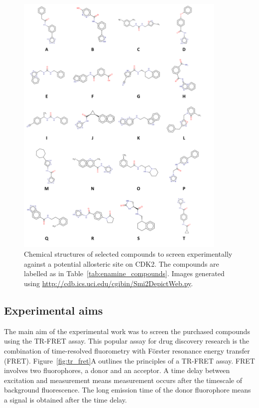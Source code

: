 \begin{figure}
\centering

\includegraphics[width=0.9\textwidth]{figures/compound_structures/compound_structures}

\caption{Chemical structures of selected compounds to screen experimentally against a potential allosteric site on CDK2.
The compounds are labelled as in Table~\ref{tab:enamine_compounds}.
Images generated using \url{http://cdb.ics.uci.edu/cgibin/Smi2DepictWeb.py}.}

\label{fig:compound_structures}
\end{figure}


\subsection{Experimental aims}

The main aim of the experimental work was to screen the purchased compounds using the TR-FRET assay.
This popular assay for drug discovery research is the combination of time-resolved fluorometry with F\"{o}rster resonance energy transfer (FRET).
Figure~\ref{fig:tr_fret}A outlines the principles of a TR-FRET assay.
FRET involves two fluorophores, a donor and an acceptor.
A time delay between excitation and measurement means measurement occurs after the timescale of background fluorescence.
The long emission time of the donor fluorophore means a signal is obtained after the time delay.


